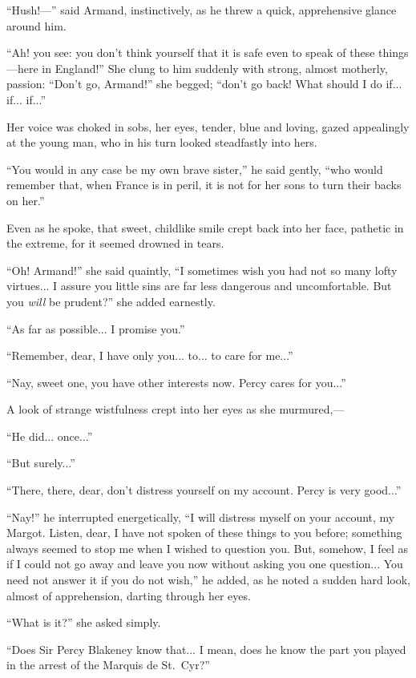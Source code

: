 \documentclass[paper=a5,BCOR=7mm,twoside,DIV=calc,12pt,usegeometry,chapterprefix,endperiod,headings=big]{scrbook}
\begin{document}
\enquote{Hush!---} said Armand, instinctively, as he threw a quick, apprehensive glance around him.

\enquote{Ah! you see: you don't think yourself that it is safe even to speak of these things---here in England!} She clung to him suddenly with strong, almost motherly, passion: \enquote{Don't go, Armand!} she begged; \enquote{don't go back! What should I do if... if... if...}

Her voice was choked in sobs, her eyes, tender, blue and loving, gazed appealingly at the young man, who in his turn looked steadfastly into hers.

\enquote{You would in any case be my own brave sister,} he said gently, \enquote{who would remember that, when France is in peril, it is not for her sons to turn their backs on her.}

Even as he spoke, that sweet, childlike smile crept back into her face, pathetic in the extreme, for it seemed drowned in tears.

\enquote{Oh! Armand!} she said quaintly, \enquote{I sometimes wish you had not so many lofty virtues... I assure you little sins are far less dangerous and uncomfortable. But you \textit{will} be prudent?} she added earnestly.

\enquote{As far as possible... I promise you.}

\enquote{Remember, dear, I have only you... to... to care for me...}

\enquote{Nay, sweet one, you have other interests now. Percy cares for you...}

A look of strange wistfulness crept into her eyes as she murmured,---

\enquote{He did... once...}

\enquote{But surely...}

\enquote{There, there, dear, don't distress yourself on my account. Percy is very good...}

\enquote{Nay!} he interrupted energetically, \enquote{I will distress myself on your account, my Margot. Listen, dear, I have not spoken of these things to you before; something always seemed to stop me when I wished to question you. But, somehow, I feel as if I could not go away and leave you now without asking you one question... You need not answer it if you do not wish,} he added, as he noted a sudden hard look, almost of apprehension, darting through her eyes.

\enquote{What is it?} she asked simply.

\enquote{Does Sir Percy Blakeney know that... I mean, does he know the part you played in the arrest of the Marquis de St.~Cyr?}
\end{document}
